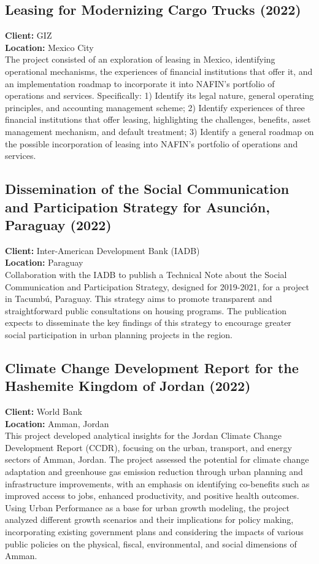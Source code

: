 \documentclass[
	a4paper,
	12pt,
	unnumberedsections,
]{CSSullivanBusinessReport}
\begin{document}
\subsection{Leasing for Modernizing Cargo Trucks (2022)}
\textbf{Client:}  GIZ \\
\textbf{Location:}  Mexico City \\[0.5em]
 The project consisted of an exploration of leasing in Mexico, identifying operational mechanisms, the experiences of financial institutions that offer it, and an implementation roadmap to incorporate it into NAFIN's portfolio of operations and services. Specifically: 1) Identify its legal nature, general operating principles, and accounting management scheme; 2) Identify experiences of three financial institutions that offer leasing, highlighting the challenges, benefits, asset management mechanism, and default treatment; 3) Identify a general roadmap on the possible incorporation of leasing into NAFIN's portfolio of operations and services.

\subsection{Dissemination of the Social Communication and Participation Strategy for Asunción, Paraguay (2022)}
\textbf{Client:}  Inter-American Development Bank (IADB) \\
\textbf{Location:}  Paraguay \\[0.5em]
 Collaboration with the IADB to publish a Technical Note about the Social Communication and Participation Strategy, designed for 2019-2021, for a project in Tacumbú, Paraguay. This strategy aims to promote transparent and straightforward public consultations on housing programs. The publication expects to disseminate the key findings of this strategy to encourage greater social participation in urban planning projects in the region.

\subsection{Climate Change Development Report for the Hashemite Kingdom of Jordan (2022)}
\textbf{Client:}  World Bank \\
\textbf{Location:}  Amman, Jordan \\[0.5em]
 This project developed analytical insights for the Jordan Climate Change Development Report (CCDR), focusing on the urban, transport, and energy sectors of Amman, Jordan. The project assessed the potential for climate change adaptation and greenhouse gas emission reduction through urban planning and infrastructure improvements, with an emphasis on identifying co-benefits such as improved access to jobs, enhanced productivity, and positive health outcomes. Using Urban Performance as a base for urban growth modeling, the project analyzed different growth scenarios and their implications for policy making, incorporating existing government plans and considering the impacts of various public policies on the physical, fiscal, environmental, and social dimensions of Amman.
\end{document}
